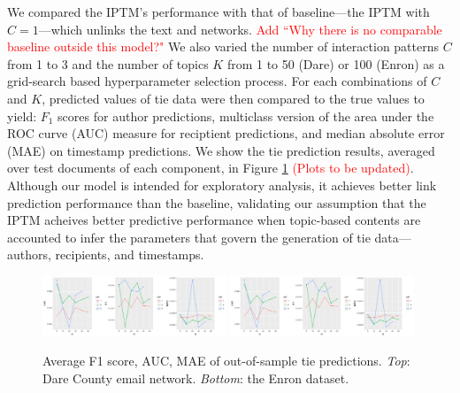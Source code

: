 \documentclass{article}
\begin{document}
We compared the IPTM's performance with that of baseline---the IPTM with $C=1$---which unlinks the text and networks. \textcolor{red}{Add ``Why there is no comparable baseline outside this model?"} We also varied the number of interaction patterns $C$ from 1 to 3 and the number of topics $K$ from 1 to 50 (Dare) or 100 (Enron) as a grid-search based hyperparameter selection process. For each combinations of $C$ and $K$, predicted values of tie data were then compared to the true values to yield: $F_1$ scores for author predictions, multiclass version of the area under the ROC curve (AUC) measure \cite{hand2001simple} for reciptient predictions, and median absolute error (MAE) on timestamp predictions. We show the tie prediction results, averaged over test documents of each component, in Figure \ref{fig:PPE} \textcolor{red}{(Plots to be updated)}. Although our model is intended for exploratory analysis, it achieves better link prediction performance than the baseline, validating our assumption that the IPTM acheives better predictive performance when topic-based contents are accounted to infer the parameters that govern the generation of tie data---authors, recipients, and timestamps.
\begin{figure}[tb]
	\centering
	\includegraphics[width = 0.49\textwidth, trim= 0.7cm 0cm 0cm 0cm, clip=true]{plots/Dare_PPE.pdf} 
		\includegraphics[width = 0.49\textwidth, trim= 0.7cm 0cm 0cm 0cm, clip=true]{plots/Dare_PPE.pdf}   
	\caption{Average F1 score,  AUC, MAE of out-of-sample tie predictions. \textit{Top}: Dare County email network. \textit{Bottom}: the Enron dataset.}
	\label{fig:PPE}	
\end{figure}
\end{document}

